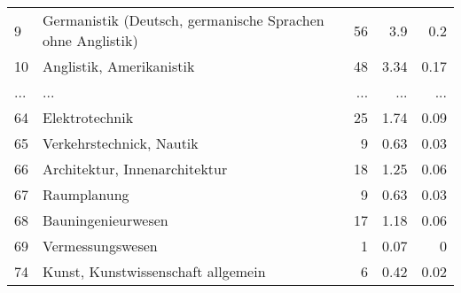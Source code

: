 \begin{longtable}{lXrrr}
        9 & \multicolumn{1}{X}{Germanistik (Deutsch, germanische Sprachen ohne Anglistik)} & %
          \num{56} &
          \num[round-mode=places,round-precision=2]{3,9} &
          \num[round-mode=places,round-precision=2]{0,2} \\
        10 & \multicolumn{1}{X}{Anglistik, Amerikanistik} & %
          \num{48} &
          \num[round-mode=places,round-precision=2]{3,34} &
          \num[round-mode=places,round-precision=2]{0,17} \\
       ... & ... & ... & ... & ... \\
        64 & \multicolumn{1}{X}{Elektrotechnik} & %
          \num{25} &
          \num[round-mode=places,round-precision=2]{1,74} &
          \num[round-mode=places,round-precision=2]{0,09} \\

        65 & \multicolumn{1}{X}{Verkehrstechnick, Nautik} & %
          \num{9} &
          \num[round-mode=places,round-precision=2]{0,63} &
          \num[round-mode=places,round-precision=2]{0,03} \\

        66 & \multicolumn{1}{X}{Architektur, Innenarchitektur} & %
          \num{18} &
          \num[round-mode=places,round-precision=2]{1,25} &
          \num[round-mode=places,round-precision=2]{0,06} \\

        67 & \multicolumn{1}{X}{Raumplanung} & %
          \num{9} &
          \num[round-mode=places,round-precision=2]{0,63} &
          \num[round-mode=places,round-precision=2]{0,03} \\

        68 & \multicolumn{1}{X}{Bauningenieurwesen} & %
          \num{17} &
          \num[round-mode=places,round-precision=2]{1,18} &
          \num[round-mode=places,round-precision=2]{0,06} \\

        69 & \multicolumn{1}{X}{Vermessungswesen} & %
          \num{1} &
          \num[round-mode=places,round-precision=2]{0,07} &
          \num[round-mode=places,round-precision=2]{0} \\

        74 & \multicolumn{1}{X}{Kunst, Kunstwissenschaft allgemein} & %
          \num{6} &
          \num[round-mode=places,round-precision=2]{0,42} &
          \num[round-mode=places,round-precision=2]{0,02} \\


\end{longtable}
